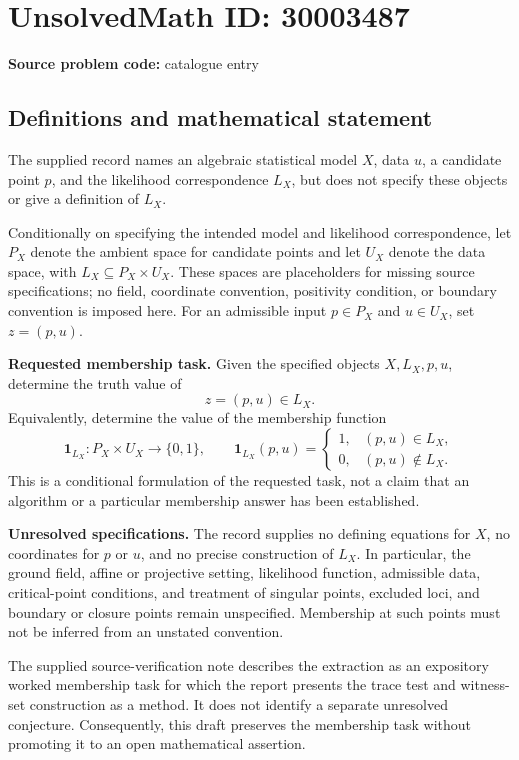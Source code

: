 \documentclass[11pt]{article}
\begin{document}
\section*{UnsolvedMath ID: 30003487}
\textbf{Source problem code:} catalogue entry
\subsection{Definitions and mathematical statement}
The supplied record names an algebraic statistical model \(X\), data \(u\), a candidate point \(p\), and the likelihood correspondence \(L_X\), but does not specify these objects or give a definition of \(L_X\).

Conditionally on specifying the intended model and likelihood correspondence, let \(P_X\) denote the ambient space for candidate points and let \(U_X\) denote the data space, with \(L_X\subseteq P_X\times U_X\). These spaces are placeholders for missing source specifications; no field, coordinate convention, positivity condition, or boundary convention is imposed here. For an admissible input \(p\in P_X\) and \(u\in U_X\), set \(z=(p,u)\).

\textbf{Requested membership task.} Given the specified objects \(X,L_X,p,u\), determine the truth value of
\[
 z=(p,u)\in L_X.
\]
Equivalently, determine the value of the membership function
\[
\mathbf{1}_{L_X}\colon P_X\times U_X\longrightarrow\{0,1\},\qquad
\mathbf{1}_{L_X}(p,u)=
\begin{cases}
1,&(p,u)\in L_X,\\
0,&(p,u)\notin L_X.
\end{cases}
\]
This is a conditional formulation of the requested task, not a claim that an algorithm or a particular membership answer has been established.

\textbf{Unresolved specifications.} The record supplies no defining equations for \(X\), no coordinates for \(p\) or \(u\), and no precise construction of \(L_X\). In particular, the ground field, affine or projective setting, likelihood function, admissible data, critical-point conditions, and treatment of singular points, excluded loci, and boundary or closure points remain unspecified. Membership at such points must not be inferred from an unstated convention.

The supplied source-verification note describes the extraction as an expository worked membership task for which the report presents the trace test and witness-set construction as a method. It does not identify a separate unresolved conjecture. Consequently, this draft preserves the membership task without promoting it to an open mathematical assertion.
\end{document}
